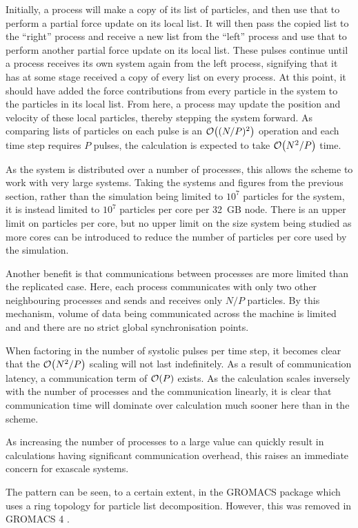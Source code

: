Initially, a process will make a copy of its list of particles,
and then use that to perform a partial force update on its local list.
%
It will then pass the copied list to the ``right'' process and
receive a new list from the ``left'' process and use that to perform
another partial force update on its local list.
%
These pulses continue until a process receives its own system again from
the left process, signifying that it has at some stage received
a copy of every list on every process.
%
At this point, it should have added the force contributions from
every particle in the system to the particles in its local list.
%
From here, a process may update the position and velocity of these local
particles, thereby stepping the system forward.
%
As comparing lists of particles on each pulse is an $\mathcal{O}{\left({ (N/P)^2 }\right)}$ operation
and each time step requires $P$ pulses, the calculation is expected to take
$\mathcal{O}{\left({ N^2/P }\right)}$ time.


%
As the system is distributed over a number of processes, this allows
the scheme to work with very large systems.
%
Taking the systems and figures from the previous section,
rather than the simulation being limited to $10^7$ particles for the system,
it is instead limited to $10^7$ particles per core per 32~GB node.
%
There is an upper limit on particles per core, but no
upper limit on the size system being studied as more cores can be introduced
to reduce the number of particles per core used by the simulation.

Another benefit is that
communications between processes are more limited than
the replicated case.
%
Here, each process communicates with only two other neighbouring processes
and sends and receives only $N/P$ particles.
%
By this mechanism, volume of data
being communicated across the machine is limited
and and there are no strict global synchronisation points.

When factoring in the number of systolic pulses per time step,
it becomes clear that the $\mathcal{O}{\left({ N^2/P }\right)}$ scaling will not last indefinitely.
%
As a result of communication latency, a communication term of
$\mathcal{O}{\left({ P }\right)}$ exists.
%
As the calculation scales inversely with the number of processes
and the communication linearly, it is clear that communication time will
dominate over calculation much sooner here than
in the \replicateddata{} scheme.

%
As increasing the number of processes to a large value
can quickly result in calculations having significant communication overhead,
this raises an immediate concern for exascale systems.


The \systolicloop{} pattern can be seen, to a certain extent, in the
GROMACS \cite{berendsen1995gromacs} package which uses a ring
topology for particle list decomposition.
%
However, this was removed in GROMACS 4 \cite{hess2008gromacs}.
